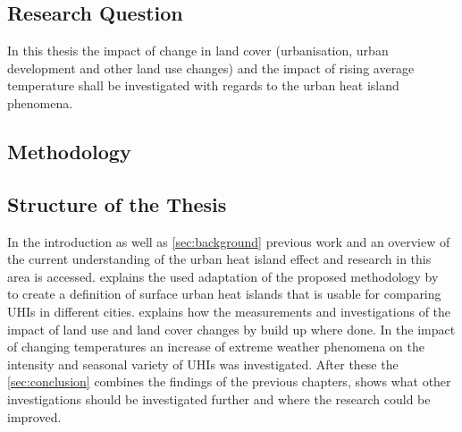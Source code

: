 \documentclass[a4paper, english]{article}
\begin{document}
  \subsection{Research Question}
    In this thesis the impact of change in land cover (urbanisation, urban development and other land use changes) and the impact of rising average temperature shall be investigated with regards to the urban heat island phenomena.

  \subsection{Methodology}
    





  \subsection{Structure of the Thesis}
    In the introduction as well as \cref{sec:background} previous work and an overview of the current understanding of the urban heat island effect and research in this area is accessed. 
     explains the used adaptation of the proposed methodology by~\cite{Sobrino2020} to create a definition of surface urban heat islands that is usable for comparing \glspl{UHI} in different cities.  
     explains how the measurements  and investigations of the impact of land use and land cover changes by build up where done.
    In  the impact of changing temperatures an increase of extreme weather phenomena on the intensity and seasonal variety of \glspl{UHI} was investigated. 
    After these the \cref{sec:conclusion} combines the findings of the previous chapters, shows what other investigations should be investigated further and where the research could be improved. 

   

\end{document}
